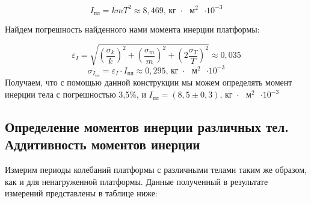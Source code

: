 \documentclass[a4paper,14pt]{extarticle}
\begin{document}
	\begin{equation}
		I_\text{пл} = kmT^2 \approx 8,469  \text{,  кг $\cdot$ $\text{м}^2$ $\cdot 10^{-3}$}  
	\end{equation}
	
	Найдем погрешность найденного нами момента инерции платформы:
	
	\begin{equation}
		\varepsilon_I = \sqrt{ \left(\frac{\sigma_k}{k}\right)^2 +\left(\frac{\sigma_m}{m}\right)^2 + \left(2\frac{\sigma_T}{T}\right)^2} \approx 0,035
	\end{equation}
	\begin{equation}
		\sigma_{I_\text{пл}} = \varepsilon_I \cdot I_\text{пл} \approx 0,295 \text{,  кг $\cdot$ $\text{м}^2$ $\cdot 10^{-3}$}
	\end{equation}
	Получаем, что с помощью данной конструкции мы можем определять момент инерции тела с погрешностью 3,5\%, и $I_\text{пл} = \left(8,5 \pm 0,3\right) \text{,  кг $\cdot$ $\text{м}^2$ $\cdot 10^{-3}$}$
	
	\subsection{Определение моментов инерции различных тел. Аддитивность моментов инерции}
	
	Измерим периоды колебаний платформы с различными телами таким же образом, как и для ненагруженной платформы. Данные полученный в результате измерений представлены в таблице ниже:
	
\end{document}
